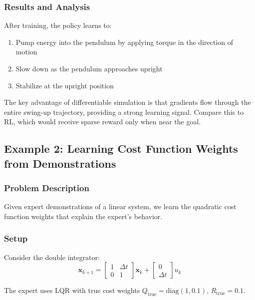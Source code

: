 \subsubsection{Results and Analysis}

After training, the policy learns to:
\begin{enumerate}
    \item Pump energy into the pendulum by applying torque in the direction of motion
    \item Slow down as the pendulum approaches upright
    \item Stabilize at the upright position
\end{enumerate}

The key advantage of differentiable simulation is that gradients flow through the entire swing-up trajectory, providing a strong learning signal. Compare this to RL, which would receive sparse reward only when near the goal.

\subsection{Example 2: Learning Cost Function Weights from Demonstrations}

\subsubsection{Problem Description}

Given expert demonstrations of a linear system, we learn the quadratic cost function weights that explain the expert's behavior.

\subsubsection{Setup}

Consider the double integrator:
\begin{equation}
\mathbf{x}_{k+1} = \begin{bmatrix} 1 & \Delta t \\ 0 & 1 \end{bmatrix} \mathbf{x}_k + \begin{bmatrix} 0 \\ \Delta t \end{bmatrix} u_k
\end{equation}

The expert uses LQR with true cost weights $Q_{\text{true}} = \text{diag}(1, 0.1)$, $R_{\text{true}} = 0.1$.

